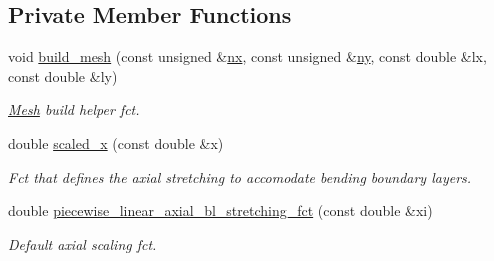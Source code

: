 \subsection*{Private Member Functions}
\begin{DoxyCompactItemize}
\item 
void \hyperlink{classoomph_1_1CircularCylindricalShellMesh_a032ddb9b1afa4ef446ca74c8a6965000}{build\+\_\+mesh} (const unsigned \&\hyperlink{classoomph_1_1RectangularQuadMesh_abfef93d6322886cdce14a437186e4821}{nx}, const unsigned \&\hyperlink{classoomph_1_1RectangularQuadMesh_a86d76a55eb7c4e8bca9b74d23c8b0412}{ny}, const double \&lx, const double \&ly)
\begin{DoxyCompactList}\small\item\em \hyperlink{classoomph_1_1Mesh}{Mesh} build helper fct. \end{DoxyCompactList}\item 
double \hyperlink{classoomph_1_1CircularCylindricalShellMesh_a4fb67c76ca3ad60efadfe2d3aabcfa0b}{scaled\+\_\+x} (const double \&x)
\begin{DoxyCompactList}\small\item\em Fct that defines the axial stretching to accomodate bending boundary layers. \end{DoxyCompactList}\item 
double \hyperlink{classoomph_1_1CircularCylindricalShellMesh_a5730df8baedd890ca909f31e5452f3db}{piecewise\+\_\+linear\+\_\+axial\+\_\+bl\+\_\+stretching\+\_\+fct} (const double \&xi)
\begin{DoxyCompactList}\small\item\em Default axial scaling fct. \end{DoxyCompactList}\end{DoxyCompactItemize}

